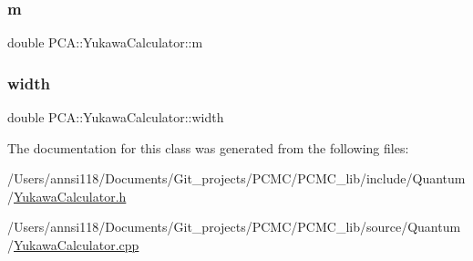 \subsubsection{\texorpdfstring{m}{m}}
{\footnotesize\ttfamily double P\+C\+A\+::\+Yukawa\+Calculator\+::m\hspace{0.3cm}{\ttfamily [private]}}

\hypertarget{class_p_c_a_1_1_yukawa_calculator_a69e1097584c632e6e43320ef6fc384dc}{}\label{class_p_c_a_1_1_yukawa_calculator_a69e1097584c632e6e43320ef6fc384dc} 
\subsubsection{\texorpdfstring{width}{width}}
{\footnotesize\ttfamily double P\+C\+A\+::\+Yukawa\+Calculator\+::width\hspace{0.3cm}{\ttfamily [private]}}



The documentation for this class was generated from the following files\+:\begin{DoxyCompactItemize}
\item 
/\+Users/annsi118/\+Documents/\+Git\+\_\+projects/\+P\+C\+M\+C/\+P\+C\+M\+C\+\_\+lib/include/\+Quantum/\hyperlink{_yukawa_calculator_8h}{Yukawa\+Calculator.\+h}\item 
/\+Users/annsi118/\+Documents/\+Git\+\_\+projects/\+P\+C\+M\+C/\+P\+C\+M\+C\+\_\+lib/source/\+Quantum/\hyperlink{_yukawa_calculator_8cpp}{Yukawa\+Calculator.\+cpp}\end{DoxyCompactItemize}
